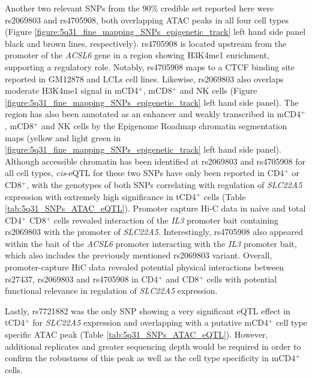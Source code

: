 Another two relevant SNPs from the 90\% credible set reported here were rs2069803 and rs4705908, both overlapping ATAC peaks in all four cell types (Figure \ref{figure:5q31_fine_mapping_SNPs_epigenetic_track} left hand side panel black and brown lines, respectively). rs4705908 is located upstream from the promoter of the \textit{ACSL6} gene in a region showing H3K4me1 enrichment, supporting a regulatory role. Notably, rs4705908 maps to a CTCF binding site reported in GM12878 and LCLs cell lines. Likewise, rs2069803 also overlaps moderate H3K4me1 signal in mCD4$^+$, mCD8$^+$ and NK cells (Figure \ref{figure:5q31_fine_mapping_SNPs_epigenetic_track} left hand side panel). The region has also been annotated as an enhancer and weakly transcribed in mCD4$^+$, mCD8$^+$ and NK cells by the Epigenome Roadmap chromatin segmentation maps (yellow and light green in \ref{figure:5q31_fine_mapping_SNPs_epigenetic_track} left hand side panel). Although accessible chromatin has been identified at rs2069803 and rs4705908 for all cell types, \textit{cis}-eQTL for these two SNPs have only been reported in CD4$^+$ or CD8$^+$, with the genotypes of both SNPs correlating with regulation of \textit{SLC22A5} expression with extremely high significance in tCD4$^+$ cells (Table \ref{tab:5q31_SNPs_ATAC_eQTL}). Promoter capture Hi-C data in na\'{i}ve and total CD4$^+$ CD8$^+$ cells revealed interaction of the \textit{IL3} promoter bait containing rs2069803  with the promoter of \textit{SLC22A5}. Interestingly, rs4705908 also appeared within the bait of the \textit{ACSL6} promoter interacting with the \textit{IL3} promoter bait, which also includes the previously mentioned rs2069803 variant. Overall, promoter-capture HiC data revealed potential physical interactions between rs27437, rs2069803 and rs4705908 in CD4$^+$ and CD8$^+$ cells with potential functional relevance in regulation of \textit{SLC22A5} expression.

Lastly, rs7721882 was the only SNP showing a very significant eQTL effect in tCD4$^+$ for \textit{SLC22A5} expression and overlapping with a putative mCD4$^+$ cell type specific ATAC peak (Table \ref{tab:5q31_SNPs_ATAC_eQTL}). However, additional replicates and greater sequencing depth would be required in order to confirm the robustness of this peak as well as the cell type specificity in mCD4$^+$ cells.  


